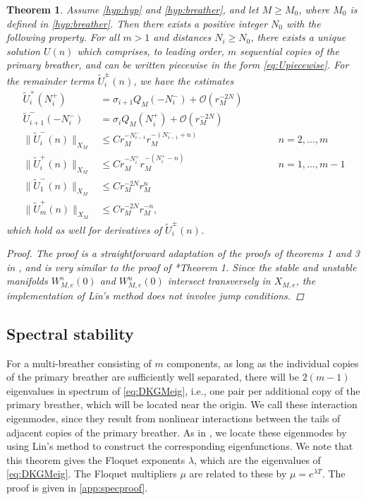 \documentclass[12pt,reqno]{amsart}
\newtheorem{theorem}{Theorem}
\theoremstyle{definition}
\begin{document}
\begin{theorem}\label{th:multi-breathers}
Assume \cref{hyp:hyp} and \cref{hyp:breather}, and let $M \geq M_0$, where $M_0$ is defined in \cref{hyp:breather}. Then there exists a positive integer $N_0$ with the following property. For all $m > 1$ and distances $N_i \geq N_0$, there exists a unique solution $U(n)$ which comprises, to leading order, $m$ sequential copies of the primary breather, and can be written piecewise in the form \cref{eq:Upiecewise}. For the remainder terms $\tilde{U}_i^\pm(n)$, we have the estimates
\begin{equation}\label{eq:Uestimates}
\begin{aligned}
\tilde{U}_i^+(N_i^+) &= \sigma_{i+1} Q_M(-N_i^-) + \mathcal{O}(r_M^{-2N}) \\
\tilde{U}_{i+1}^-(-N_i^-) &= \sigma_{i} Q_M(N_i^+) + \mathcal{O}(r_M^{-2N}) \\ 
\| \tilde{U}_i^-(n)\|_{X_M} &\leq C r_M^{-N_{i-1}^-} r_M^{-(N_{i-1}^- + n)} && \qquad n = 2, \dots, m\\
\|\tilde{U}_i^+(n) \|_{X_M} &\leq C r_M^{-N_i^+} r_M^{-(N_i^+ - n)} && \qquad n = 1, \dots, m-1 \\
\| \tilde{U}_1^-(n)\|_{X_M} &\leq C r_M^{-2N} r_M^{n} \\
\|\tilde{U}_m^+(n) \|_{X_M} &\leq C r_M^{-2N} r_M^{-n},
\end{aligned}
\end{equation}
which hold as well for derivatives of $\tilde{U}_i^\pm(n)$.
\begin{proof}
The proof is a straightforward adaptation of the proofs of theorems 1 and 3 in \cite{Parker2020}, and is very similar to the proof of \cite{Parker2021}*{Theorem 1}. Since the stable and unstable manifolds $W_{M,e}^s(0)$ and $W_{M,e}^u(0)$ intersect transversely in $X_{M,e}$, the implementation of Lin's method does not involve jump conditions.
\end{proof}
\end{theorem}

\subsection{Spectral stability}

For a multi-breather consisting of $m$ components, as long as the individual copies of the primary breather are sufficiently well separated, there will be $2(m-1)$ eigenvalues in spectrum of \cref{eq:DKGMeig}, i.e., one pair per additional copy of the primary breather, which will be located near the origin. We call these interaction eigenmodes, since they result from nonlinear interactions between the tails of adjacent copies of the primary breather.
As in \cites{Parker2020,Sandstede1998}, we locate these eigenmodes by using Lin's method to construct the corresponding eigenfunctions. We note that this theorem gives the Floquet exponents $\lambda$, which are the eigenvalues of \cref{eq:DKGMeig}. The Floquet multipliers $\mu$ are related to these by $\mu = e^{\lambda T}$. The proof is given in \cref{app:specproof}.
\end{document}
